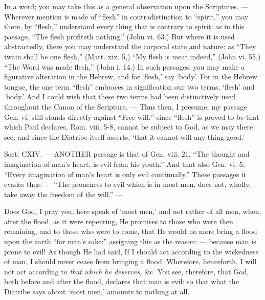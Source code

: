 In a word; you may take this as a general observation upon the Scriptures. — Wherever mention is made of “flesh” in contradistinction to “spirit,” you may there, by “flesh,” understand every thing that is contrary to spirit: as in this passage, “The flesh profiteth nothing.” (John vi. 63.) But where it is used abstractedly, there you may understand the corporal state and nature: as “They twain shall be one flesh,” (Matt. xix. 5,) “My flesh is meat indeed,” (John vi. 55,) “The Word was made flesh,” (John i. 14.) In such passages, you may make a figurative alteration in the Hebrew, and for ‘flesh,’ say ‘body’. For in the Hebrew tongue, the one term “flesh” embraces in signification our two terms, ‘flesh’ and ‘body.’ And I could wish that these two terms had been distinctively used throughout the Canon of the Scripture. — Thus then, I presume, my passage Gen. vi. still stands directly against “Free-will:” since “flesh” is proved to be that which Paul declares, Rom. viii. 5-8, cannot be subject to God, as we may there see; and since the Diatribe itself asserts, ‘that it cannot will any thing good.’


Sect. CXIV. — ANOTHER passage is that of Gen. viii. 21, “The thought and imagination of man’s heart, is evil from his youth.” And that also Gen. vi. 5, “Every imagination of man’s heart is only evil continually.” These passages it evades thus: — “The proneness to evil which is in most men, does not, wholly, take away the freedom of the will.” —

Does God, I pray you, here speak of ‘most men,’ and not rather of all men, when, after the flood, as it were repenting, He promises to those who were then remaining, and to those who were to come, that He would no more bring a flood upon the earth “for man’s sake:” assigning this as the reason: — because man is prone to evil! As though He had said, If I should act according to the wickedness of man, I should never cease from bringing a flood. Wherefore, henceforth, I will not act according to \emph{ that which he deserves,} \&c. You see, therefore, that God, both before and after the flood, declares that man is evil: so that what the Diatribe says about ‘most men,’ amounts to nothing at all.

